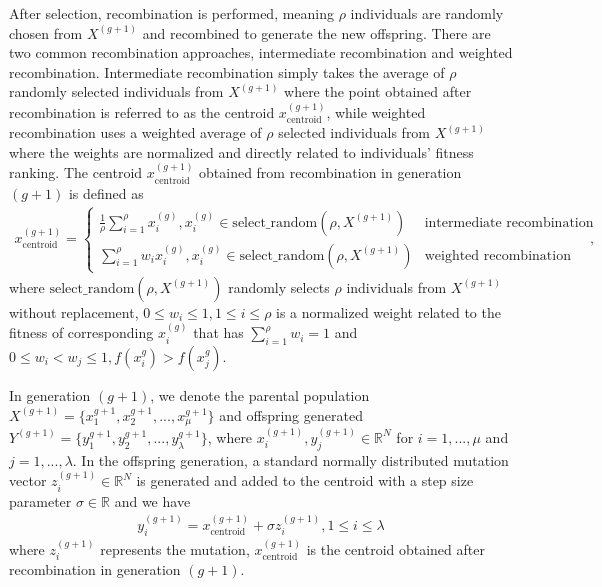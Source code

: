 After selection, recombination is performed, meaning $\rho$ individuals are randomly chosen from $X^{(g+1)}$ and recombined to generate the new offspring. There are two common recombination approaches, intermediate recombination and weighted recombination. Intermediate recombination simply takes the average of $\rho$ randomly selected individuals from $X^{(g+1)}$ where the point obtained after recombination is referred to as the centroid $x_{\text{centroid}}^{(g+1)}$, while weighted recombination uses a weighted average of $\rho$ selected individuals from $X^{(g+1)}$ where the weights are normalized and directly related to individuals' fitness ranking. The centroid $x_{\text{centroid}}^{(g+1)}$ obtained from recombination in generation $(g+1)$ is defined as
\begin{align}
x_{\text{centroid}}^{(g+1)} = 
\begin{cases}
\frac{1}{\rho} \sum_{i=1}^\rho x_i^{(g)},x_i^{(g)} \in \text{select\_random} (\rho , X^{(g+1)}) & \text{intermediate recombination}\\
\sum_{i=1}^\rho w_i x_i^{(g)} ,x_i^{(g)} \in \text{select\_random} (\rho , X^{(g+1)}) & \text{weighted recombination}
\end{cases},
\end{align}
where $\text{select\_random}(\rho,X^{(g+1)})$ randomly selects $\rho$ individuals from $X^{(g+1)}$ without replacement, $0 \leq w_i \leq 1, 1 \leq i \leq \rho$ is a normalized weight related to the fitness of corresponding $x_i^{(g)}$ that has $\sum_{i=1}^\rho w_i = 1$ and $0\leq w_i < w_j \leq 1,f(x_i^{g}) > f(x_j^{g})$. 

In generation $(g+1)$, we denote the parental population $X^{(g+1)} = \{x_1^{g+1},x_2^{g+1},...,x_\mu^{g+1} \}$ and offspring generated $Y^{(g+1)} = \{y_1^{g+1},y_2^{g+1},...,y_{\lambda}^{g+1} \}$, where $x_i^{(g+1)},y_j^{(g+1)} \in \mathbb{R}^N$ for $i=1,...,\mu$ and $j=1,...,\lambda$. In the offspring generation, a standard normally distributed mutation vector $z_i^{(g+1)} \in \mathbb{R}^N $ is generated and added to the centroid with a step size parameter $\sigma \in \mathbb{R}$ and we have 
\begin{align}
y_i^{(g+1)} = x_{\text{centroid}}^{(g+1)} + \sigma z_i^{(g+1)}, 1\leq i \leq \lambda
\end{align}
where $z_i^{(g+1)}$ represents the mutation, $x_{\text{centroid}}^{(g+1)}$ is the centroid obtained after recombination in generation $(g+1)$. 

